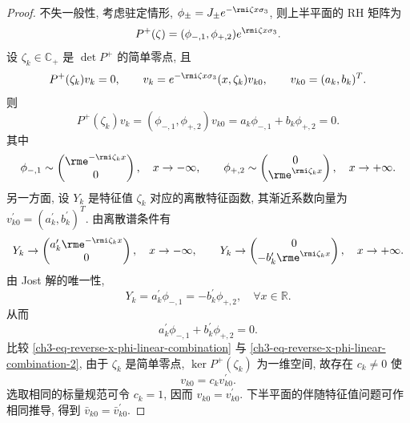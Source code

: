 \begin{proof}
    不失一般性, 考虑驻定情形, $\phi_{\pm} = J_{\pm}e^{-\rmi \zeta x \sigma_{3}}$, 则上半平面的 RH 矩阵为
    \begin{equation}
        P^{+}(\zeta) = (\phi_{-,1},\phi_{+,2})e^{\rmi \zeta x \sigma_{3}}.
    \end{equation}
    设 $\zeta_{k} \in \mathbb{C}_{+}$ 是 $\det P^{+}$ 的简单零点, 且
    \begin{equation}
        P^{+}(\zeta_{k})v_{k} = 0,\qquad v_{k} = e^{-\rmi \zeta x \sigma_{3}}(x,\zeta_{k})v_{k0},\qquad v_{k0} = (a_{k},b_{k})^{T}.
    \end{equation}
    则
    \begin{equation}
        P^{+}(\zeta_{k})v_{k} = (\phi_{-,1},\phi_{+,2}) v_{k0} = a_{k}\phi_{-,1} + b_{k}\phi_{+,2} = 0. \label{ch3-eq-reverse-x-phi-linear-combination}
    \end{equation}
    其中
    \begin{equation}
        \phi_{-,1} \sim \begin{pmatrix}\rme^{- \rmi \zeta_{k}x}\\0\end{pmatrix},\quad x \to -\infty,\qquad \phi_{+,2} \sim \begin{pmatrix}0\\\rme^{\rmi \zeta_{k}x}\end{pmatrix},\quad x \to +\infty.
    \end{equation}
    另一方面, 设 $Y_{k}$ 是特征值 $\zeta_{k}$ 对应的离散特征函数, 其渐近系数向量为 $v_{k0}^{\prime} = (a_{k}^{\prime},b_{k}^{\prime})^{T}$. 由离散谱条件有
    \begin{equation}
        Y_{k} \to \begin{pmatrix}a_{k}^{\prime}\rme^{- \rmi \zeta_{k}x}\\0\end{pmatrix},\quad x \to -\infty,\qquad Y_{k} \to \begin{pmatrix}0\\-b_{k}^{\prime}\rme^{\rmi \zeta_{k}x}\end{pmatrix},\quad x \to +\infty.
    \end{equation}
    由 Jost 解的唯一性,
    \begin{equation}
        Y_{k} = a_{k}^{\prime}\phi_{-,1} = -b_{k}^{\prime}\phi_{+,2}, \quad \forall x \in \mathbb{R}.
    \end{equation}
    从而
    \begin{equation}
        a_{k}^{\prime}\phi_{-,1} + b_{k}^{\prime}\phi_{+,2} = 0. \label{ch3-eq-reverse-x-phi-linear-combination-2}
    \end{equation}
    比较 \eqref{ch3-eq-reverse-x-phi-linear-combination} 与 \eqref{ch3-eq-reverse-x-phi-linear-combination-2}, 由于 $\zeta_{k}$ 是简单零点, $\ker P^{+}(\zeta_{k})$ 为一维空间, 故存在 $c_{k} \neq 0$ 使
    \begin{equation}
        v_{k0} = c_{k}v_{k0}^{\prime}.
    \end{equation}
    选取相同的标量规范可令 $c_{k} = 1$, 因而 $v_{k0} = v_{k0}^{\prime}$. 下半平面的伴随特征值问题可作相同推导, 得到 $\bar{v}_{k0} = \bar{v}_{k0}^{\prime}$.
\end{proof}
